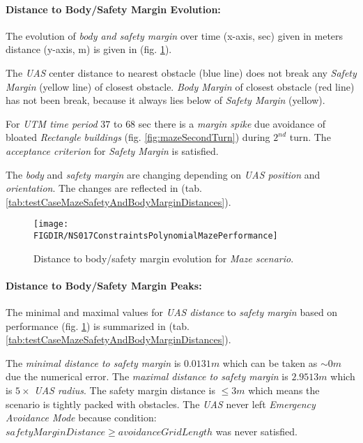 \paragraph{Distance to Body/Safety Margin Evolution:}  The evolution of \emph{body and safety margin} over time (x-axis, sec) given in  meters distance (y-axis, m) is given in (fig. \ref{fig:testCaseMazeAvoidancePerformance}).

The \emph{UAS} center distance to nearest obstacle (blue line) does not break any \emph{Safety Margin} (yellow line) of closest obstacle. \emph{Body Margin} of closest obstacle (red line) has not been break, because it always lies below of \emph{Safety Margin} (yellow).

For \emph{UTM time period} $37$ to $68$ sec there is a \emph{margin spike}  due avoidance of bloated \emph{Rectangle buildings} (fig. \ref{fig:mazeSecondTurn}) during $2^{nd}$ turn. The \emph{acceptance criterion} for \emph{Safety Margin} is satisfied.

\begin{note}
The \emph{body} and \emph{safety margin} are changing  depending on \emph{UAS position} and \emph{orientation}. The changes are reflected in (tab. \ref{tab:testCaseMazeSafetyAndBodyMarginDistances}).
\end{note}


\begin{figure}[H]
    \centering
    \texttt{[image: \\FIGDIR/NS017ConstraintsPolynomialMazePerformance]} 
    \caption{Distance to body/safety margin evolution for \emph{Maze scenario}.}
    \label{fig:testCaseMazeAvoidancePerformance}
\end{figure}

\paragraph{Distance to Body/Safety Margin Peaks:} The minimal and maximal values for \emph{UAS distance} to \emph{safety margin} based on performance (fig. \ref{fig:testCaseMazeAvoidancePerformance}) is summarized in (tab. \ref{tab:testCaseMazeSafetyAndBodyMarginDistances}).

The \emph{minimal distance to safety margin} is $0.0131 m$ which can be taken as $\sim 0m$ due the numerical error. The \emph{maximal distance to safety margin} is $2.9513 m$ which is $5 \times$ \emph{UAS radius}. The safety margin distance is $\le 3 m$ which means the scenario is tightly packed with obstacles. The \emph{UAS} never left \emph{Emergency Avoidance Mode} because condition: $safety Margin Distance \ge avoidance Grid Length$ was never satisfied. 

